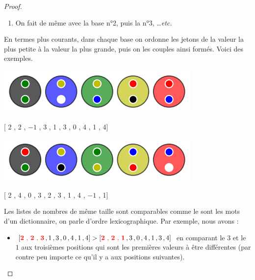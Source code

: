 \begin{proof}
\begin{enumerate}
		\item On fait de même avec la base n°2, puis la n°3, \dots \textit{etc.}
	\end{enumerate}
	
	En termes plus courants, dans chaque base on ordonne les jetons de la valeur la plus petite à la valeur la plus grande, puis on  les couples  ainsi formés. Voici des exemples.

	\vspace{-0.4em}
	\begin{center}   %
		\includegraphics[scale= 0.45]{content/algo_bubble/modelization/example_a.png}
		
		[{\color{black} 2 , 2} , {\color{blue} $-1$ , 3} , {\color{ForestGreen} 1 , 3} , {\color{Goldenrod} 0 , 4} , {\color{red} 1 , 4}]


		\medskip     %
		
		\includegraphics[scale= 0.45]{content/algo_bubble/modelization/example_b.png}
		
		[{\color{black} 2 , 4} , {\color{blue} 0 , 3} , {\color{ForestGreen} 2 , 3} , {\color{Goldenrod} 1 , 4} , {\color{red} $-1$ , 1}]
	\end{center}

	Les listes de nombres de même taille sont comparables comme le sont les mots d'un dictionnaire, on parle d'ordre lexicographique. Par exemple, nous avons :
	
	\medskip
	
	\begin{itemize}
		\item[\textbullet] $[\text{\color{red} \textbf{2} , \textbf{2} , \textbf{3}} \, , 1 \, , 3 \, , 0 \, , 4 \, , 1 \, , 4] > [\text{\color{red} \textbf{2} , \textbf{2} , \textbf{1}} \, , 3 \, , 0 \, , 4 \, , 1 \, , 3 \, , 4]$
		en comparant le $3$ et le $1$ aux troisièmes positions qui sont les premières valeurs à être différentes (par contre peu importe ce qu'il y a aux positions suivantes).


\end{itemize}
\end{proof}
